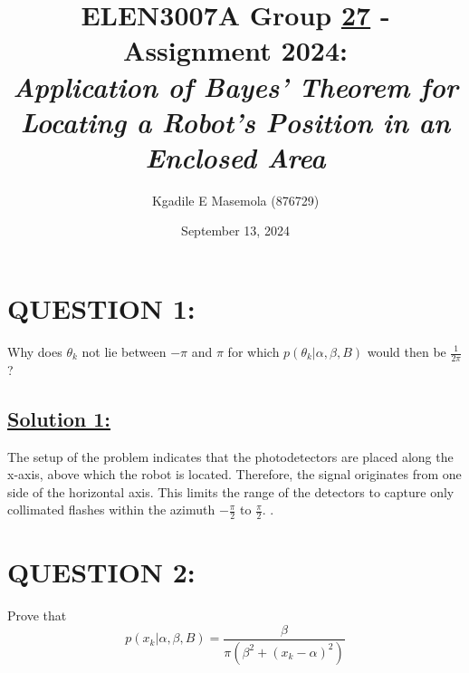 \documentclass[a4paper,11pt]{article}
\title{ELEN3007A Group \underline{27} - Assignment 2024: \\ 
\large \emph{Application of Bayes’ Theorem for Locating a Robot’s
Position in an Enclosed Area}}
\author{Kgadile E Masemola (876729)}
\date{September 13, 2024}
\begin{document}
\maketitle

\section{QUESTION 1:}  Why does $\theta_k$ not lie between $- \pi$ and $\pi$ for which $p(\theta_k | \alpha, \beta, B)$ would then be $\frac{1}{2\pi}$?

\subsection*{\underline{Solution 1:}}
The setup of the problem indicates that the photodetectors are placed along the x-axis, above
which the robot is located. Therefore, the signal originates from one side of the horizontal axis.
This limits the range of the detectors to capture only collimated flashes within the azimuth $-\frac{\pi}{2}$ to $\frac{\pi}{2}$. . 

\section{QUESTION 2:}
Prove that
\begin{equation}
	p(x_k | \alpha, \beta, B) = \frac{\beta}{\pi (\beta^2 + (x_k - \alpha)^2)}
\end{equation}
\end{document}
